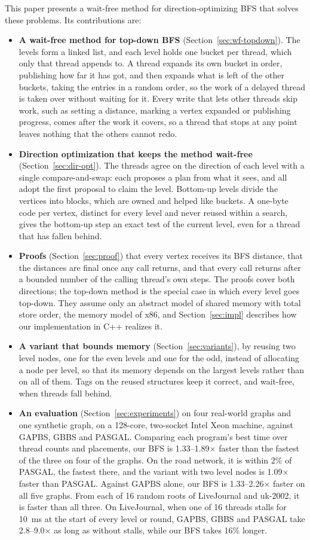 This paper presents a wait-free method for direction-optimizing BFS that solves these problems. Its contributions are:
\begin{itemize}
    \item \textbf{A wait-free method for top-down BFS} (Section~\ref{sec:wf-topdown}). The levels form a linked list, and each level holds one bucket per thread, which only that thread appends to. A thread expands its own bucket in order, publishing how far it has got, and then expands what is left of the other buckets, taking the entries in a random order, so the work of a delayed thread is taken over without waiting for it. Every write that lets other threads skip work, such as setting a distance, marking a vertex expanded or publishing progress, comes after the work it covers, so a thread that stops at any point leaves nothing that the others cannot redo.
    \item \textbf{Direction optimization that keeps the method wait-free} (Section~\ref{sec:dir-opt}). The threads agree on the direction of each level with a single compare-and-swap: each proposes a plan from what it sees, and all adopt the first proposal to claim the level. Bottom-up levels divide the vertices into blocks, which are owned and helped like buckets. A one-byte code per vertex, distinct for every level and never reused within a search, gives the bottom-up step an exact test of the current level, even for a thread that has fallen behind.
    \item \textbf{Proofs} (Section~\ref{sec:proof}) that every vertex receives its BFS distance, that the distances are final once any call returns, and that every call returns after a bounded number of the calling thread's own steps. The proofs cover both directions; the top-down method is the special case in which every level goes top-down. They assume only an abstract model of shared memory with total store order, the memory model of x86, and Section~\ref{sec:impl} describes how our implementation in C++ realizes it.
    \item \textbf{A variant that bounds memory} (Section~\ref{sec:variants}), by reusing two level nodes, one for the even levels and one for the odd, instead of allocating a node per level, so that its memory depends on the largest levels rather than on all of them. Tags on the reused structures keep it correct, and wait-free, when threads fall behind.
    \item \textbf{An evaluation} (Section~\ref{sec:experiments}) on four real-world graphs and one synthetic graph, on a 128-core, two-socket Intel Xeon machine, against GAPBS, GBBS and PASGAL. Comparing each program's best time over thread counts and placements, our BFS is 1.33--1.89$\times$ faster than the fastest of the three on four of the graphs. On the road network, it is within 2\% of PASGAL, the fastest there, and the variant with two level nodes is 1.09$\times$ faster than PASGAL. Against GAPBS alone, our BFS is 1.33--2.26$\times$ faster on all five graphs. From each of 16 random roots of LiveJournal and uk-2002, it is faster than all three. On LiveJournal, when one of 16 threads stalls for 10~ms at the start of every level or round, GAPBS, GBBS and PASGAL take 2.8--9.0$\times$ as long as without stalls, while our BFS takes 16\% longer.
\end{itemize}

